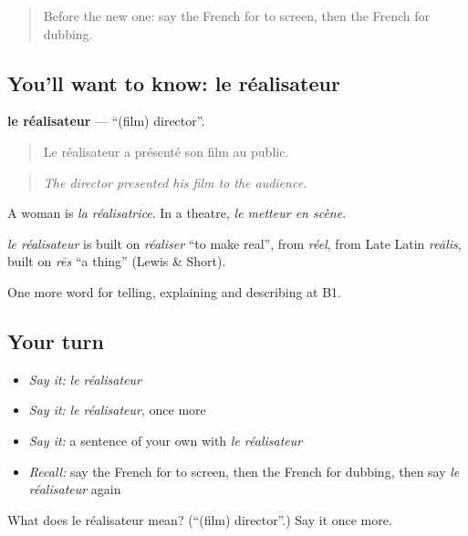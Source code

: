 \begin{quote}
Before the new one: say the French for to screen, then the French for dubbing.
\end{quote}

\subsection*{You'll want to know: le réalisateur}
\textbf{le réalisateur} — \textquotedblleft{}(film) director\textquotedblright{}.

\begin{quote}
Le réalisateur a présenté son film au public.
\end{quote}

\begin{quote}
\emph{The director presented his film to the audience.}
\end{quote}

A woman is \emph{la réalisatrice}. In a theatre, \emph{le metteur en scène}.

\begin{cousinweb}
\emph{le réalisateur} is built on \emph{réaliser} \textquotedblleft{}to make real\textquotedblright{}, from \emph{réel}, from Late Latin \emph{reālis}, built on \emph{rēs} \textquotedblleft{}a thing\textquotedblright{} (Lewis \& Short).
\end{cousinweb}

\begin{grammarlens}[title={What you've built}]
One more word for telling, explaining and describing at B1.
\end{grammarlens}

\subsection*{Your turn}
\begin{itemize}
\raggedright
  \item \emph{Say it:} \emph{le réalisateur}
  \item \emph{Say it:} \emph{le réalisateur}, once more
  \item \emph{Say it:} a sentence of your own with \emph{le réalisateur}
  \item \emph{Recall:} say the French for to screen, then the French for dubbing, then say \emph{le réalisateur} again
\end{itemize}

\begin{tcolorbox}[breakable,colback=teal!4,colframe=teal!35!black,title={Before you move on}]
What does le réalisateur mean? (\textquotedblleft{}(film) director\textquotedblright{}.) Say it once more.
\end{tcolorbox}
